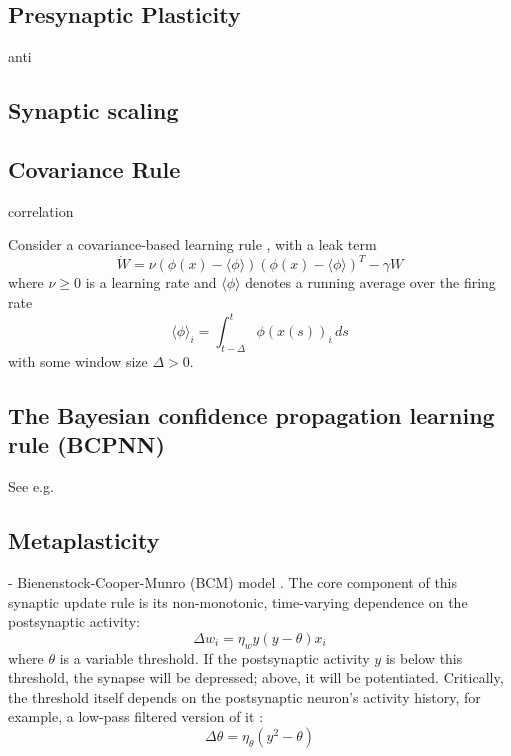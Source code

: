 \documentclass{article}
\theoremstyle{definition} \newtheorem{definition}{Definition}
\theoremstyle{remark} \newtheorem{remark}{Remark}
\newcounter{ct}
\begin{document}
\subsection{Presynaptic Plasticity}
\citep{mongillo2008synaptic}
\citep{masse2019circuit}

anti \citep{magnasco2009self}

\subsection{Synaptic scaling}
\citep{renart2003robust}

\subsection{Covariance Rule}
correlation\citep{bi2001synaptic}

\citep{amit1989modeling}
Consider a covariance-based learning rule \citep{sejnowski1989hebb, gerstner2002mathematical}, with a leak term  
\begin{equation}
    \dot{W} = \nu \left( \phi(x) - \langle \phi \rangle \right) \left( \phi(x) - \langle \phi \rangle \right)^T - \gamma W
\end{equation}
where $\nu \geq 0$ is a learning rate and $\langle \phi \rangle$ denotes a running average over the firing rate  
\begin{equation}
    \langle \phi \rangle_i = \int_{t-\Delta}^{t} \phi(x(s))_i \, ds
\end{equation}
with some window size $\Delta > 0$.

\subsection{The Bayesian confidence propagation learning rule (BCPNN)}
See e.g. \citep{lansner2023fast}

\subsection{Metaplasticity}
 - Bienenstock-Cooper-Munro (BCM) model \cite{bienenstock1982theory}. The core component of this synaptic update rule is its non-monotonic, time-varying dependence on the postsynaptic activity:  
\begin{equation}
    \Delta w_i = \eta_w y (y - \theta) x_i
\end{equation}
where $\theta$ is a variable threshold. If the postsynaptic activity $y$ is below this threshold, the synapse will be depressed; above, it will be potentiated. Critically, the threshold itself depends on the postsynaptic neuron’s activity history, for example, a low-pass filtered version of it \cite[Ch.~8.2]{dayan2005theoretical}:  
\begin{equation}
    \Delta \theta = \eta_\theta (y^2 - \theta)
\end{equation}
\end{document}

